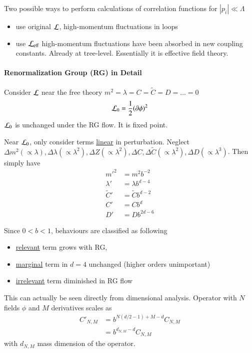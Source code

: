 Two possible ways to perform calculations of correlation functions for $|p_i| \ll \Lambda$ 
\begin{itemize}
   \item use original $\mathcal{L}$, high-momentum fluctuations in loops
   \item use $\mathcal{L}_{\text{eff}}$ high-momentum fluctuations have been absorbed in new coupling constants. Already at tree-level. Essentially it is effective field theory.
\end{itemize}

\paragraph{Renormalization Group (RG) in Detail}
Consider $\mathcal{L}$ near the free theory $m^2 = \lambda =C = \tilde{C} = D = \dots = 0$
\begin{align*}
   \mathcal{L}_0 = \frac{1}{2} (\partial \phi)^2
\end{align*}
$\mathcal{L}_0$ is unchanged under the RG flow. It is fixed point.

Near $\mathcal{L}_0$, only consider terms \underline{linear} in perturbation. Neglect $\Delta m^2 (\propto \lambda), \Delta \lambda (\propto \lambda^2), \Delta Z (\propto \lambda^2), \Delta C, \Delta \tilde{C} (\propto \lambda^2), \Delta D (\propto \lambda^3)$. Then simply have 
\begin{align*}
   m'^2 &= m^2 b^{-2} \\
   \lambda' &= \lambda b^{d-4} \\
   \tilde{C}' &= \tilde{C} b^{d-2} \\
   C' &= C b^d \\
   D' &= D b^{2d-6}
\end{align*}

Since $0 < b < 1$, behaviours are classified as following
\begin{itemize}
   \item \underline{relevant} term grows with RG, 
   \item \underline{marginal} term in $d=4$ unchanged  (higher orders unimportant)
   \item \underline{irrelevant} term diminished in RG flow
\end{itemize}

This can actually be seen directly from dimensional analysis. Operator with $N$ fields $\phi$ and $M$ derivatives scales as 
\begin{align*}
   C'_{N, M} &= b^{N(d/2 - 1) + M - d} C_{N, M} \\
             &= b^{d_{N, M} - d} C_{N, M}
\end{align*}
with $d_{N,M}$ mass dimension of the operator.

